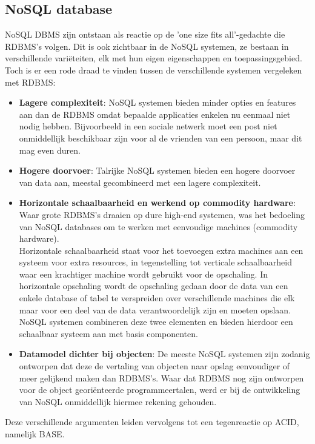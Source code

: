 \subsection{NoSQL database}\label{sec:eventualconsistency}
NoSQL DBMS zijn ontstaan als reactie op de 'one size fits all'-gedachte die RDBMS's volgen. Dit is ook zichtbaar in de NoSQL systemen, ze bestaan in verschillende variëteiten, elk met hun eigen eigenschappen en toepassingsgebied. Toch is er een rode draad te vinden tussen de verschillende systemen vergeleken met RDBMS: 
\begin{itemize}
	\item \textbf{Lagere complexiteit}: NoSQL systemen bieden minder opties en features aan dan de RDBMS omdat bepaalde applicaties enkelen nu eenmaal niet nodig hebben. Bijvoorbeeld in een sociale netwerk moet een post niet onmiddellijk beschikbaar zijn voor al de vrienden van een persoon, maar dit mag even duren.
	\item \textbf{Hogere doorvoer}: Talrijke NoSQL systemen bieden een hogere doorvoer van data aan, meestal gecombineerd met een lagere complexiteit. 
	\item \textbf{Horizontale schaalbaarheid en werkend op commodity hardware}: Waar grote RDBMS's draaien op dure high-end systemen, was het bedoeling van NoSQL databases om te werken met eenvoudige machines (commodity hardware). \\
	Horizontale schaalbaarheid staat voor het toevoegen extra machines aan een systeem voor extra resources, in tegenstelling tot verticale schaalbaarheid waar een krachtiger machine wordt gebruikt voor de opschaling. In horizontale opschaling wordt de opschaling gedaan door de data van een enkele database of tabel te verspreiden over verschillende machines die elk maar voor een deel van de data verantwoordelijk zijn en moeten opslaan.\\
	NoSQL systemen combineren deze twee elementen en bieden hierdoor een schaalbaar systeem aan met basis componenten.
	\item \textbf{Datamodel dichter bij objecten}: De meeste NoSQL systemen zijn zodanig ontworpen dat deze de vertaling van objecten naar opslag eenvoudiger of meer gelijkend maken dan RDBMS's. Waar dat RDBMS nog zijn ontworpen voor de object georiënteerde programmeertalen, werd er bij de ontwikkeling van NoSQL onmiddellijk hiermee rekening gehouden.  
\end{itemize}  \noindent
Deze verschillende argumenten leiden vervolgens tot een tegenreactie op ACID, namelijk BASE. \noindent
